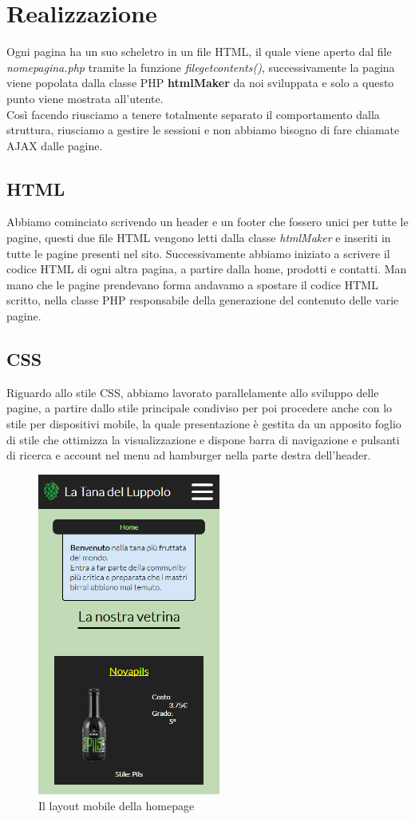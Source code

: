 \section{Realizzazione}
Ogni pagina ha un suo scheletro in un file HTML, il quale viene aperto dal file \textit{nome\textunderscore pagina.php} tramite la funzione \textit{file\textunderscore get\textunderscore contents()}, successivamente la pagina viene popolata dalla classe PHP \textbf{htmlMaker} da noi sviluppata e solo a questo punto viene mostrata all'utente.\\
Così facendo riusciamo a tenere totalmente separato il comportamento dalla struttura, riusciamo a gestire le sessioni e non abbiamo bisogno di fare chiamate AJAX dalle pagine.
\subsection{HTML}
Abbiamo cominciato scrivendo un header e un footer che fossero unici per tutte le pagine, questi due file HTML vengono letti dalla classe \textit{htmlMaker} e inseriti in tutte le pagine presenti nel sito. Successivamente abbiamo iniziato a scrivere il codice HTML di ogni altra pagina, a partire dalla home, prodotti e contatti. Man mano che le pagine prendevano forma andavamo a spostare il codice HTML scritto, nella classe PHP responsabile della generazione del contenuto delle varie pagine.
\subsection{CSS}
Riguardo allo stile CSS, abbiamo lavorato parallelamente allo sviluppo delle pagine, a partire dallo stile principale condiviso per poi procedere anche con lo stile per dispositivi mobile, la quale presentazione è gestita da un apposito foglio di stile che ottimizza la visualizzazione e dispone barra di navigazione e pulsanti di ricerca e account nel menu ad hamburger nella parte destra dell'header.

\begin{figure}[H]
	\centering
	\includegraphics[width=6cm]{utility/home_mobile.png}
	\caption{Il layout mobile della homepage}
\end{figure}

